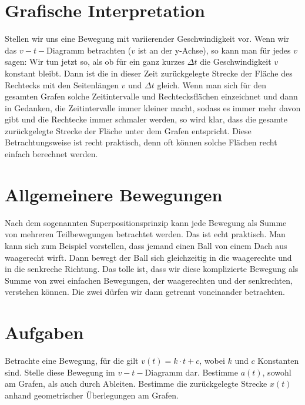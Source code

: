 \documentclass[a4paper, twocolumn, 9pt]{article}
\begin{document}
\begin{footnotesize}
\section*{Grafische Interpretation}
Stellen wir uns eine Bewegung mit variierender Geschwindigkeit vor. Wenn wir das $v-t-$Diagramm betrachten ($v$ ist an der y-Achse), so kann man für jedes $v$ sagen: Wir tun jetzt so, als ob für ein ganz kurzes $\Delta t$ die Geschwindigkeit $v$ konstant bleibt. Dann ist die in dieser Zeit zurückgelegte Strecke der Fläche des Rechtecks mit den Seitenlängen $v$ und $\Delta t$ gleich. Wenn man sich für den gesamten Grafen solche Zeitintervalle und Rechtecksflächen einzeichnet und dann in Gedanken, die Zeitintervalle immer kleiner macht, sodass es immer mehr davon gibt und die Rechtecke immer schmaler werden, so wird klar, dass die gesamte zurückgelegte Strecke der Fläche unter dem Grafen entspricht. Diese Betrachtungsweise ist recht praktisch, denn oft können solche Flächen recht einfach berechnet werden.   
\section*{Allgemeinere Bewegungen}
Nach dem sogenannten Superpositionsprinzip kann jede Bewegung als Summe von mehreren Teilbewegungen betrachtet werden. Das ist echt praktisch. Man kann sich zum Beispiel vorstellen, dass jemand einen Ball von einem Dach aus waagerecht wirft. Dann bewegt der Ball sich gleichzeitig in die waagerechte und in die senkreche Richtung. Das tolle ist, dass wir diese komplizierte Bewegung als Summe von zwei einfachen Bewegungen, der waagerechten und der senkrechten, verstehen können. Die zwei dürfen wir dann getrennt voneinander betrachten.  
\section*{Aufgaben}
Betrachte eine Bewegung, für die gilt $v(t)=k\cdot t+c$, wobei $k$ und $c$ Konstanten sind. Stelle diese Bewegung im $v-t-$Diagramm dar. Bestimme $a(t)$, sowohl am Grafen, als auch durch Ableiten. Bestimme die zurückgelegte Strecke $x(t)$ anhand geometrischer Überlegungen am Grafen.   
\end{footnotesize}
\end{document}
